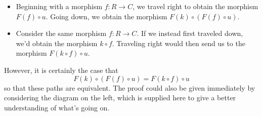 \begin{prf}
        \begin{minipage}{0.5\textwidth}
            \hspace{-1cm}
            \begin{center}
                \hspace{-0.4cm}
            \end{center}
        \end{minipage}
        \hspace{-0.4cm}
        \begin{minipage}{0.5\textwidth}
            \begin{itemize}
                \item[\textcolor{Red}{\textbullet}]
                Beginning with a morphism $f: R \to C$, we travel right 
                to obtain the morphism $F(f) \circ u$. Going down, we obtain 
                the morphism $F(k) \circ (F(f) \circ u)$.  
                \item[\textcolor{Blue!80}{\textbullet}]
                Consider the same morphism $f: R \to C$. If we instead first traveled down, 
                we'd obtain the morphism $k \circ f$. Traveling right would then 
                send us to the morphism $F(k \circ f) \circ u$. 
            \end{itemize}
        \end{minipage}
        However, it is certainly the case that 
        \[
            F(k) \circ (F(f) \circ u) 
            = 
            F(k \circ f) \circ u
        \]
        so that these paths are equivalent. The proof could also be given immediately 
        by considering the diagram on the left, which is supplied here to give a better 
        understanding of what's going on.


\end{prf}
